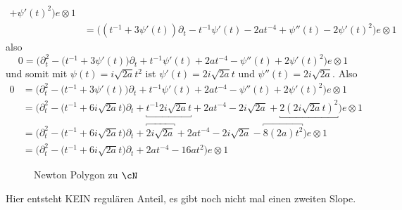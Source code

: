 \begin{try}
\begin{align*}
    + \psi'(t)^2\Big) e\otimes 1 \\
  &= \Big((t^{-1} + 3\psi'(t))\partial_t
    - t^{-1} \psi'(t) - 2at^{-4} + \psi''(t)
    - 2 \psi'(t)^2\Big) e\otimes 1
\end{align*}
also
\[
0 = \Big(\partial_t^2 - \big(t^{-1} + 3\psi'(t)\big)\partial_t
    + t^{-1} \psi'(t) + 2at^{-4} -\psi''(t)
    + 2 \psi'(t)^2\Big) e\otimes 1
\]
und somit mit $\psi(t)=i\sqrt{2a}t^2$ ist $\psi'(t)=2i\sqrt{2a}t$ und
$\psi''(t)=2i\sqrt{2a}$. Also
\begin{align*}
0 &= \Big(\partial_t^2 - \big(t^{-1} + 3\psi'(t)\big)\partial_t
    + t^{-1} \psi'(t) + 2at^{-4} -\psi''(t)
    + 2 \psi'(t)^2\Big) e\otimes 1
\\&= \Big(\partial_t^2 - \big(t^{-1} + 6i\sqrt{2a}t\big)\partial_t
    + \underbracket{t^{-1} 2i\sqrt{2a}t} + 2at^{-4} - 2i\sqrt{2a}
    + \underbracket{2 (2i\sqrt{2a}t)^2}\Big) e\otimes 1
\\&= \Big(\partial_t^2 - \big(t^{-1} + 6i\sqrt{2a}t\big)\partial_t
    + \overbracket{2i\sqrt{2a}} + 2at^{-4} - 2i\sqrt{2a}
    - \overbracket{8 (2a) t^2}\Big) e\otimes 1
\\&= \Big(\partial_t^2 - \big(t^{-1} + 6i\sqrt{2a}t\big)\partial_t
    + 2at^{-4} - 16a t^2\Big) e\otimes 1
\end{align*}
\begin{figure}[H]
\caption{Newton Polygon zu $\cN$}
\begin{center}
\end{center}
\end{figure}
Hier entsteht KEIN regulären Anteil, es gibt noch nicht mal einen zweiten
Slope.
\end{try}
